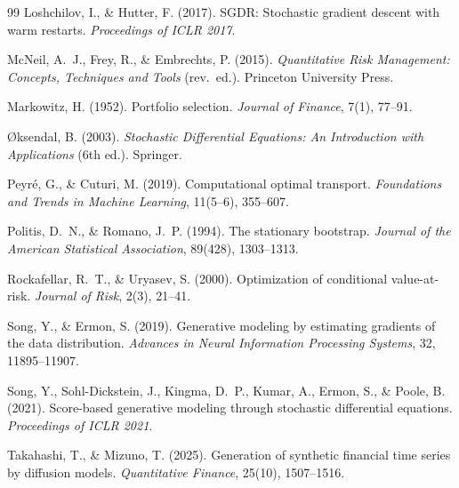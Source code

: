 \documentclass{article}
\begin{document}
\begin{thebibliography}{99}
Loshchilov, I., \& Hutter, F. (2017).
\newblock SGDR: Stochastic gradient descent with warm restarts.
\newblock \emph{Proceedings of ICLR 2017}.

McNeil, A.~J., Frey, R., \& Embrechts, P. (2015).
\newblock \emph{Quantitative Risk Management: Concepts, Techniques and Tools}
  (rev.\ ed.).
\newblock Princeton University Press.

Markowitz, H. (1952).
\newblock Portfolio selection.
\newblock \emph{Journal of Finance}, 7(1), 77--91.

{\O}ksendal, B. (2003).
\newblock \emph{Stochastic Differential Equations: An Introduction with
  Applications} (6th ed.).
\newblock Springer.

Peyr\'{e}, G., \& Cuturi, M. (2019).
\newblock Computational optimal transport.
\newblock \emph{Foundations and Trends in Machine Learning}, 11(5--6),
  355--607.

Politis, D.~N., \& Romano, J.~P. (1994).
\newblock The stationary bootstrap.
\newblock \emph{Journal of the American Statistical Association}, 89(428),
  1303--1313.

Rockafellar, R.~T., \& Uryasev, S. (2000).
\newblock Optimization of conditional value-at-risk.
\newblock \emph{Journal of Risk}, 2(3), 21--41.

Song, Y., \& Ermon, S. (2019).
\newblock Generative modeling by estimating gradients of the data distribution.
\newblock \emph{Advances in Neural Information Processing Systems}, 32,
  11895--11907.

Song, Y., Sohl-Dickstein, J., Kingma, D.~P., Kumar, A., Ermon, S., \& Poole,
  B. (2021).
\newblock Score-based generative modeling through stochastic differential
  equations.
\newblock \emph{Proceedings of ICLR 2021}.

Takahashi, T., \& Mizuno, T. (2025).
\newblock Generation of synthetic financial time series by diffusion models.
\newblock \emph{Quantitative Finance}, 25(10), 1507--1516.

\end{thebibliography}
\end{document}
